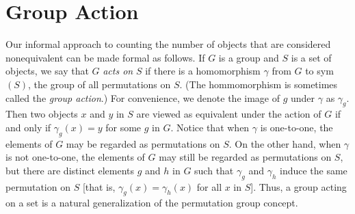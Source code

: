 \section{Group Action}

\begin{remark}
	Our informal approach to counting the number of objects that are considered nonequivalent can be made formal as follows. If $G$ is a group and $S$ is a set of objects, we say that $G$ \textit{acts on} $S$ if there is a homomorphism $\gamma$ from $G$ to sym$(S)$, the group of all permutations on $S$. (The hommomorphism is sometimes called the \textit{group action}.) For convenience, we denote the image of $g$ under $\gamma$ as $\gamma_g$. Then two objects $x$ and $y$ in $S$ are viewed as equivalent under the action of $G$ if and only if $\gamma_g(x) = y$ for some $g$ in $G$. Notice that when $\gamma$ is one-to-one, the elements of $G$ may be regarded as permutations on $S$. On the other hand, when $\gamma$ is not one-to-one, the elements of $G$ may still be regarded as permutations on $S$, but there are distinct elements $g$ and $h$ in $G$ such that $\gamma_g$ and $\gamma_h$ induce the same permutation on $S$ [that is, $\gamma_g(x) = \gamma_h(x)$ for all $x$ in $S$]. Thus, a group acting on a set is a natural generalization of the permutation group concept.
\end{remark}
